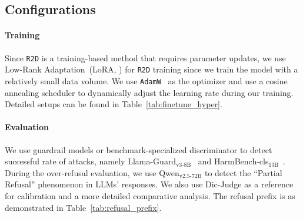 \subsection{Configurations}
\paragraph{Training} Since \texttt{R2D} is a training-based method that requires parameter updates, we use Low-Rank Adaptation~(LoRA, \citealp{hu2022lora}) for \texttt{R2D} training since we train the model with a relatively small data volume. We use \texttt{AdamW}~\cite{loshchilov2018decoupled} as the optimizer and use a cosine annealing scheduler to dynamically adjust the learning rate during our training. Detailed setups can be found in Table~\ref{tab:finetune_hyper}.

\begin{table}[t!]
\centering
{}
\caption{Hyper-parameters setups of \texttt{R2D} training.}
\label{tab:finetune_hyper}
\end{table}


\paragraph{Evaluation} We use guardrail models or benchmark-specialized discriminator to detect successful rate of attacks, namely Llama-Guard$_\text{v3-8B}$~\cite{inan2023llama} and HarmBench-cls$_\text{13B}$~\cite{pmlr-v235-mazeika24a}. During the over-refusal evaluation, we use Qwen$_\text{v2.5-72B}$ to detect the ``Partial Refusal'' phenomenon in LLMs' responses. We also use Dic-Judge as a reference for calibration and a more detailed comparative analysis. The refusal prefix is as demonstrated in Table~\ref{tab:refusal_prefix}.

